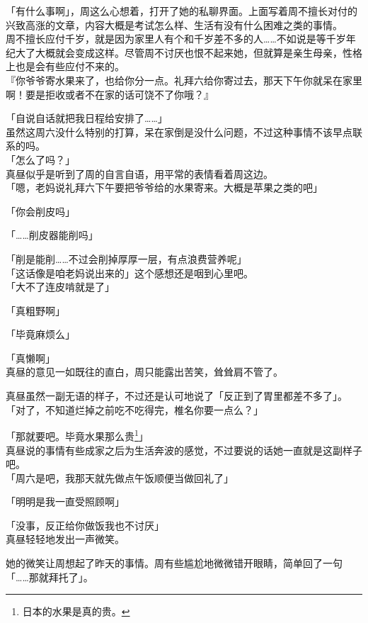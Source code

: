 「有什么事啊」，周这么心想着，打开了她的私聊界面。上面写着周不擅长对付的兴致高涨的文章，内容大概是考试怎么样、生活有没有什么困难之类的事情。\\

周不擅长应付千岁，就是因为家里人有个和千岁差不多的人……不如说是等千岁年纪大了大概就会变成这样。尽管周不讨厌也恨不起来她，但就算是亲生母亲，性格上也是会有些应付不来的。\\

『你爷爷寄水果来了，也给你分一点。礼拜六给你寄过去，那天下午你就呆在家里啊！要是拒收或者不在家的话可饶不了你哦？』

「自说自话就把我日程给安排了……」\\

虽然这周六没什么特别的打算，呆在家倒是没什么问题，不过这种事情不该早点联系的吗。\\

「怎么了吗？」\\

真昼似乎是听到了周的自言自语，用平常的表情看着周这边。\\

「嗯，老妈说礼拜六下午要把爷爷给的水果寄来。大概是苹果之类的吧」

「你会削皮吗」

「……削皮器能削吗」

「削是能削……不过会削掉厚厚一层，有点浪费营养呢」\\

「这话像是咱老妈说出来的」这个感想还是咽到心里吧。\\

「大不了连皮啃就是了」

「真粗野啊」

「毕竟麻烦么」

「真懒啊」\\

真昼的意见一如既往的直白，周只能露出苦笑，耸耸肩不管了。

真昼虽然一副无语的样子，不过还是认可地说了「反正到了胃里都差不多了」。\\

「对了，不知道烂掉之前吃不吃得完，椎名你要一点么？」

「那就要吧。毕竟水果那么贵\footnote{日本的水果是真的贵。}」\\

真昼说的事情有些成家之后为生活奔波的感觉，不过要说的话她一直就是这副样子吧。\\

「周六是吧，我那天就先做点午饭顺便当做回礼了」

「明明是我一直受照顾啊」

「没事，反正给你做饭我也不讨厌」\\

真昼轻轻地发出一声微笑。

她的微笑让周想起了昨天的事情。周有些尴尬地微微错开眼睛，简单回了一句「……那就拜托了」。
